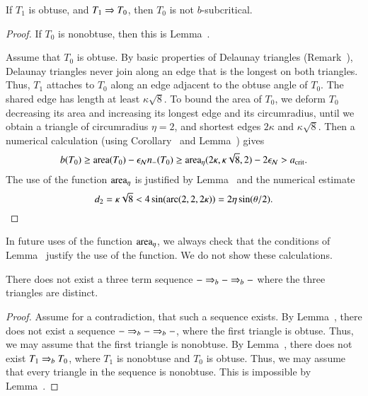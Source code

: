 \begin{lemma}
  If $T_1$ is obtuse, and $T_1 \Rightarrow T_0$, then $T_0$ is not
  $b$-subcritical.
\end{lemma}


\begin{proof}  
  If $T_0$ is nonobtuse, then this is Lemma~.

  Assume that $T_0$ is obtuse.  By basic properties of Delaunay
  triangles (Remark~), Delaunay triangles never join
  along an edge that is the longest on both triangles.  Thus, $T_1$
  attaches to $T_0$ along an edge adjacent to the obtuse angle of
  $T_0$.  The shared edge has length at least $\kappa\sqrt8$.  To
  bound the area of $T_0$, we deform $T_0$ decreasing its area and
  increasing its longest edge and its circumradius, until we obtain a
  triangle of circumradius $\eta=2$, and shortest edges $2\kappa$ and
  $\kappa\sqrt{8}$.  Then a numerical calculation (using
  Corollary~ and Lemma~) gives
\[
b(T_0) \ge {\operatorname{area}}(T_0) - \epsilon_{\mathcal N} n_-(T_0) \ge 
{\operatorname{area}}_\eta(2\kappa,\kappa\sqrt{8},2) - 2\epsilon_{\mathcal N} > a_\text{crit}.
\] %
The use of the function ${\operatorname{area}}_\eta$ is justified by
Lemma~ and the numerical estimate
\[
d_2 = \kappa\sqrt8 
<  4 \sin(\operatorname{arc}(2,2,2\kappa)) = 2\eta\sin(\theta/2).
\] %
\end{proof}

In future uses of the function ${\operatorname{area}}_\eta$, we always check that the
conditions of Lemma~ justify the use of the function.
We do not show these calculations.

\begin{lemma}  There does not exist a three
  term sequence $- \Rightarrow_{b} -\Rightarrow_{b} -$ where the three triangles are
  distinct.
\end{lemma}

\begin{proof}  
  Assume for a contradiction, that such a sequence exists.  By
  Lemma~, there does not exist a sequence $- \Rightarrow_{b} -
  \Rightarrow_{b} -$, where the first triangle is obtuse.  Thus, we may assume
  that the first triangle is nonobtuse.  By Lemma~,
  there does not exist $T_1\Rightarrow_{b} T_0$, where $T_1$ is nonobtuse and
  $T_0$ is obtuse.  Thus, we may assume that every triangle in the
  sequence is nonobtuse.  This is impossible by
  Lemma~.
\end{proof}

